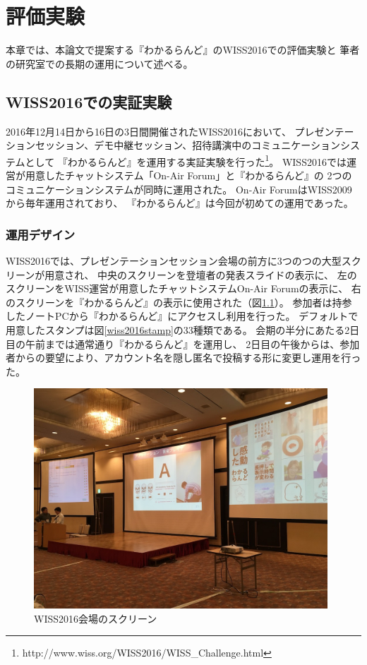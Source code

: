 \chapter{評価実験}
\label{chap:experiment}

本章では、本論文で提案する『わかるらんど』のWISS2016での評価実験と
筆者の研究室での長期の運用について述べる。

\newpage

\section{WISS2016での実証実験}
2016年12月14日から16日の3日間開催されたWISS2016において、
プレゼンテーションセッション、デモ中継セッション、招待講演中のコミュニケーションシステムとして
『わかるらんど』を運用する実証実験を行った\footnote{http://www.wiss.org/WISS2016/WISS\_Challenge.html}。
WISS2016では運営が用意したチャットシステム「On-Air Forum」と『わかるらんど』の
2つのコミュニケーションシステムが同時に運用された。
On-Air ForumはWISS2009から毎年運用されており、
『わかるらんど』は今回が初めての運用であった。

\subsection{運用デザイン}
WISS2016では、プレゼンテーションセッション会場の前方に3つのつの大型スクリーンが用意され、
中央のスクリーンを登壇者の発表スライドの表示に、
左のスクリーンをWISS運営が用意したチャットシステムOn-Air Forumの表示に、
右のスクリーンを『わかるらんど』の表示に使用された（図\ref{wiss2016}）。
参加者は持参したノートPCから『わかるらんど』にアクセスし利用を行った。
デフォルトで用意したスタンプは図\ref{wiss2016stamp}の33種類である。
会期の半分にあたる2日目の午前までは通常通り『わかるらんど』を運用し、
2日目の午後からは、参加者からの要望により、アカウント名を隠し匿名で投稿する形に変更し運用を行った。

\begin{figure}[H]
\centering
\includegraphics[width=11cm]{images/wiss2016.png}
\caption{WISS2016会場のスクリーン}
\label{wiss2016}
\end{figure}

